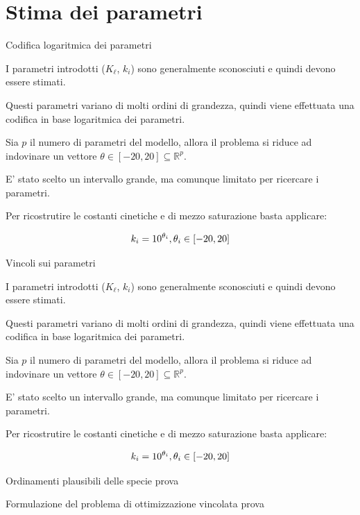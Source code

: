 \documentclass{beamer}
\begin{document}
\section{Stima dei parametri}

\begin{frame}[fragile]{Codifica logaritmica dei parametri}

I parametri introdotti ($K_\ell$, $k_i$) sono generalmente sconosciuti e quindi devono essere stimati.

Questi parametri variano di molti ordini di grandezza, quindi viene effettuata una codifica in base logaritmica dei parametri.

Sia $p$ il numero di parametri del modello, allora il problema si riduce ad indovinare un vettore $\theta \in [-20,20] \subseteq \mathbb{R}^p$.

E' stato scelto un intervallo grande, ma comunque limitato per ricercare i parametri.

Per ricostrutire le costanti cinetiche e di mezzo saturazione basta applicare:

\[
    k_i = 10^{\theta_i}, \space \theta_i \in [-20,20]
\]

\end{frame}

\begin{frame}[fragile]{Vincoli sui parametri}

I parametri introdotti ($K_\ell$, $k_i$) sono generalmente sconosciuti e quindi devono essere stimati.

Questi parametri variano di molti ordini di grandezza, quindi viene effettuata una codifica in base logaritmica dei parametri.

Sia $p$ il numero di parametri del modello, allora il problema si riduce ad indovinare un vettore $\theta \in [-20,20] \subseteq \mathbb{R}^p$.

E' stato scelto un intervallo grande, ma comunque limitato per ricercare i parametri.

Per ricostrutire le costanti cinetiche e di mezzo saturazione basta applicare:

\[
    k_i = 10^{\theta_i}, \space \theta_i \in [-20,20]
\]

\end{frame}


\begin{frame}[fragile]{Ordinamenti plausibili delle specie}
prova
\end{frame}

\begin{frame}[fragile]{Formulazione del problema di ottimizzazione vincolata}
prova
\end{frame}
\end{document}
